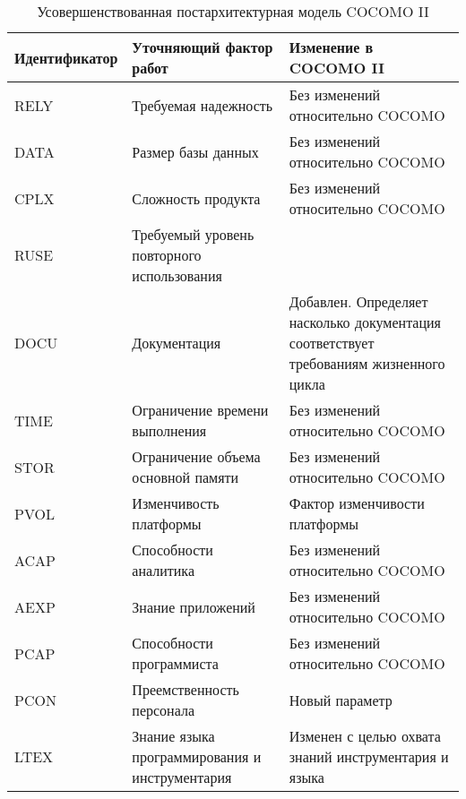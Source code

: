 \begin{table}[H]
	\caption{Усовершенствованная постархитектурная модель COCOMO II}
	\label{cocomoII}
	\begin{center}
		\begin{tabular}{| p{4 cm} | p{4 cm} | p{8.5 cm} |} 
			\hline
			\textbf{Идентификатор} & \textbf{Уточняющий фактор работ} & \textbf{Изменение в COCOMO II} \\
			\hline
			RELY & Требуемая надежность & Без изменений относительно COCOMO \\
			\hline
			DATA & Размер базы данных & Без изменений относительно COCOMO \\
			\hline
			CPLX & Сложность продукта & Без изменений относительно COCOMO \\
			\hline
			RUSE & Требуемый уровень повторного использования &  \\
			\hline
			DOCU & Документация & Добавлен. Определяет насколько документация соответствует требованиям жизненного цикла  \\
			\hline
			TIME & Ограничение времени выполнения & Без изменений относительно COCOMO \\
			\hline
			STOR & Ограничение объема основной памяти & Без изменений относительно COCOMO \\
			\hline
			PVOL & Изменчивость платформы & Фактор изменчивости платформы \\
			\hline
			ACAP & Способности аналитика & Без изменений относительно COCOMO \\
			\hline
			AEXP & Знание приложений  & Без изменений относительно COCOMO \\
			\hline
			PCAP & Способности программиста & Без изменений относительно COCOMO \\
			\hline
			PCON & Преемственность персонала & Новый параметр \\
			\hline
			LTEX & Знание языка программирования и инструментария & Изменен с целью охвата знаний инструментария и языка \\
			\hline
		\end{tabular}
	\end{center}
\end{table}

